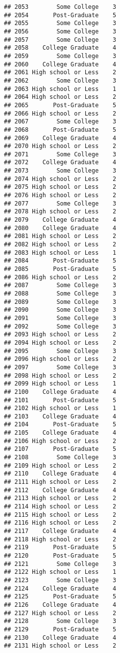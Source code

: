 \documentclass[
]{article}
\begin{document}
\begin{verbatim}
## 2053        Some College    3
## 2054       Post-Graduate    5
## 2055        Some College    3
## 2056        Some College    3
## 2057        Some College    3
## 2058    College Graduate    4
## 2059        Some College    3
## 2060    College Graduate    4
## 2061 High school or Less    2
## 2062        Some College    3
## 2063 High school or Less    1
## 2064 High school or Less    2
## 2065       Post-Graduate    5
## 2066 High school or Less    2
## 2067        Some College    3
## 2068       Post-Graduate    5
## 2069    College Graduate    4
## 2070 High school or Less    2
## 2071        Some College    3
## 2072    College Graduate    4
## 2073        Some College    3
## 2074 High school or Less    2
## 2075 High school or Less    2
## 2076 High school or Less    2
## 2077        Some College    3
## 2078 High school or Less    2
## 2079    College Graduate    4
## 2080    College Graduate    4
## 2081 High school or Less    2
## 2082 High school or Less    2
## 2083 High school or Less    1
## 2084       Post-Graduate    5
## 2085       Post-Graduate    5
## 2086 High school or Less    2
## 2087        Some College    3
## 2088        Some College    3
## 2089        Some College    3
## 2090        Some College    3
## 2091        Some College    3
## 2092        Some College    3
## 2093 High school or Less    2
## 2094 High school or Less    2
## 2095        Some College    3
## 2096 High school or Less    2
## 2097        Some College    3
## 2098 High school or Less    2
## 2099 High school or Less    1
## 2100    College Graduate    4
## 2101       Post-Graduate    5
## 2102 High school or Less    1
## 2103    College Graduate    4
## 2104       Post-Graduate    5
## 2105    College Graduate    4
## 2106 High school or Less    2
## 2107       Post-Graduate    5
## 2108        Some College    3
## 2109 High school or Less    2
## 2110    College Graduate    4
## 2111 High school or Less    2
## 2112    College Graduate    4
## 2113 High school or Less    2
## 2114 High school or Less    2
## 2115 High school or Less    2
## 2116 High school or Less    2
## 2117    College Graduate    4
## 2118 High school or Less    2
## 2119       Post-Graduate    5
## 2120       Post-Graduate    5
## 2121        Some College    3
## 2122 High school or Less    1
## 2123        Some College    3
## 2124    College Graduate    4
## 2125       Post-Graduate    5
## 2126    College Graduate    4
## 2127 High school or Less    2
## 2128        Some College    3
## 2129       Post-Graduate    5
## 2130    College Graduate    4
## 2131 High school or Less    2

\end{verbatim}
\end{document}
